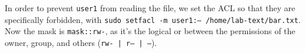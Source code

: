 In order to prevent \texttt{user1} from reading the file, we set the ACL so that they are specifically forbidden, with \texttt{sudo setfacl -m user1:--- /home/lab-text/bar.txt}. Now the mask is \texttt{mask::rw-}, as it's the logical or between the permissions of the owner, group, and others (\texttt{rw- | r-- | ---}).